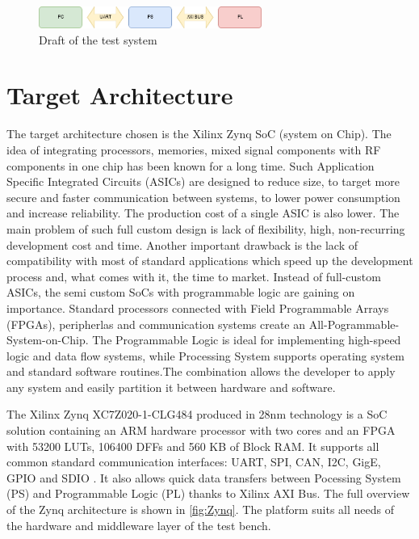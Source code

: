 \begin{figure}[H]
\centering
\includegraphics[width=0.65\textwidth]{figures/PCPSPL.png}
\caption{Draft of the test system}
\label{fig:draft}
\end{figure}

\section {Target Architecture}
The target architecture chosen is the Xilinx Zynq SoC (system on Chip). The idea of integrating processors, memories, mixed signal components with RF components in one chip has been known for a long time. Such Application Specific Integrated Circuits (ASICs) are designed to reduce size, to target more secure and faster communication between systems, to lower power consumption and increase reliability. The production cost of a single ASIC is also lower. The main problem of such full custom design is lack of flexibility, high, non-recurring development cost and time. Another important drawback is the lack of compatibility with most of standard applications which speed up the development process and, what comes with it, the time to market. Instead of full-custom ASICs, the semi custom SoCs with programmable logic are gaining on importance. Standard processors connected with Field Programmable Arrays (FPGAs), peripherlas and communication systems create an All-Pogrammable-System-on-Chip. The Programmable Logic is ideal for implementing high-speed logic and data flow systems, while Processing System supports operating system and standard software routines.The combination allows the developer to apply any system and easily partition it between hardware and software.

The Xilinx Zynq XC7Z020-1-CLG484 produced in 28nm technology is a SoC solution containing an ARM hardware processor with two cores and an FPGA with 53200 LUTs, 106400 DFFs and 560 KB of Block RAM. It supports all common standard communication interfaces: UART, SPI, CAN, I2C, GigE, GPIO and SDIO . It also allows quick data transfers between Pocessing System (PS) and Programmable Logic (PL) thanks to Xilinx AXI Bus. The full overview of the Zynq architecture is shown in \autoref{fig:Zynq}. The platform suits all needs of the hardware and middleware layer of the test bench.

